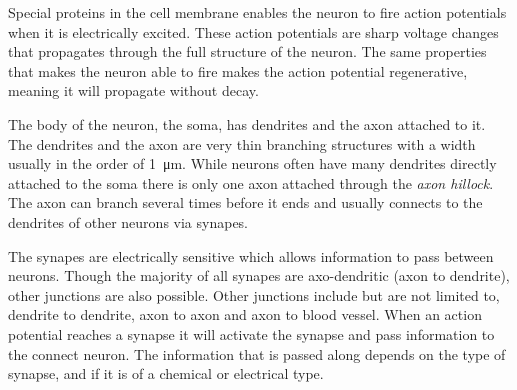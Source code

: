 \documentclass[altfont, fleqn]{uiophd}
\begin{document}
Special proteins in the cell membrane enables the neuron to
fire action potentials when it is electrically excited. 
These action potentials are sharp voltage changes that propagates through
the full structure of the neuron. 
The same properties that makes the neuron able to fire makes 
the action potential {regenerative}, meaning it will propagate
without decay.

The body of the neuron, the {soma}, has {dendrites} and 
the {axon} attached to it. 
The dendrites and the axon are very thin branching structures 
with a width usually in the order of \SI{1}{\micro\metre}. 
While neurons often have many dendrites directly attached to the soma
there is only one axon attached through the \emph{axon hillock}.
The axon can branch several times before it ends and 
usually connects to the dendrites of other neurons via synapes.

The synapes are electrically sensitive which allows information
to pass between neurons. 
Though the majority of all synapes are axo-dendritic 
(axon to dendrite),
other junctions are also possible.
Other junctions include but are not limited to,
dendrite to dendrite, 
axon to axon and 
axon to blood vessel. 
When an action potential reaches a synapse it will activate
the synapse and pass information to the connect neuron. 
The information that is passed along depends on the type of synapse,
and if it is of a chemical or electrical type.


\end{document}
